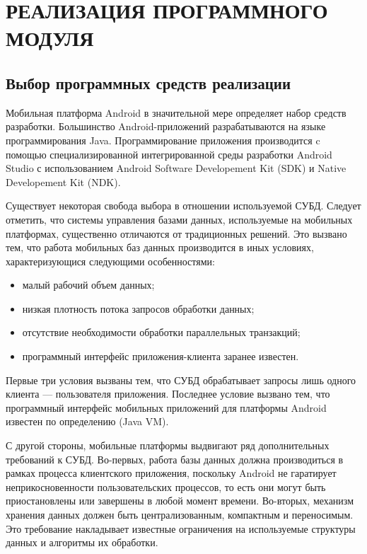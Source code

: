 \section[Реализация программного модуля]{%
  РЕАЛИЗАЦИЯ ПРОГРАММНОГО МОДУЛЯ
}\label{sec:implementation}

\subsection{Выбор программных средств реализации}

Мобильная платформа Android в значительной мере
определяет набор средств разработки. Большинство Android-приложений
разрабатываются на языке программирования Java. Программирование
приложения производится c помощью специализированной
интегрированной среды разработки Android Studio
с использованием Android Software Developement Kit (SDK)
и Native Developement Kit (NDK).

Существует некоторая свобода выбора в отношении используемой СУБД.
Следует отметить, что системы управления базами данных,
используемые на мобильных платформах, существенно отличаются
от традиционных решений.
Это вызвано тем, что работа мобильных баз данных производится в
иных условиях, характеризующися следующими особенностями:
\begin{itemize}
  \item малый рабочий объем данных;
  \item низкая плотность потока запросов обработки данных;
  \item отсутствие необходимости обработки параллельных транзакций;
  \item программный интерфейс приложения-клиента заранее известен.
\end{itemize}

Первые три условия вызваны тем, что СУБД обрабатывает запросы
лишь одного клиента --- пользователя приложения.
Последнее условие вызвано тем, что программный интерфейс мобильных
приложений для платформы Android известен по определению (Java VM).

С другой стороны, мобильные платформы выдвигают ряд
дополнительных требований к СУБД.
Во-первых, работа базы данных должна производиться в рамках
процесса клиентского приложения, поскольку Android не гаратирует
неприкосновенности пользовательских процессов, то есть они могут быть
приостановлены или завершены в любой момент времени.
Во-вторых, механизм хранения данных должен быть централизованным,
компактным и переносимым. Это требование накладывает
известные ограничения на используемые структуры данных
и алгоритмы их обработки.

